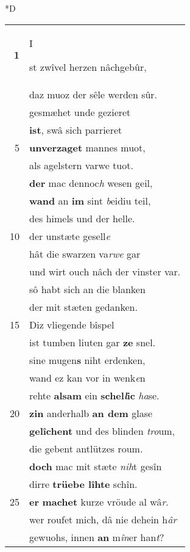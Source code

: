 \documentclass[8pt,a4paper,notitlepage]{article}
\begin{document}
\begin{table}[ht]
\begin{minipage}[t]{0.5\linewidth}
\small
\begin{center}*D
\end{center}
\begin{tabular}{rl}
\textbf{1} & \begin{Large}I\end{Large}st zwîvel herzen nâchgebûr,\\ 
 & daz muoz der sêle werden sûr.\\ 
 & gesmæhet unde gezieret\\ 
 & \textbf{ist}, swâ sich parrieret\\ 
5 & \textbf{unverzaget} mannes muot,\\ 
 & als agelstern varwe tuot.\\ 
 & \textbf{der} mac dennoc\textit{h} wesen geil,\\ 
 & \textbf{wand} an \textbf{im} sint \textit{b}eidiu teil,\\ 
 & des himels und der helle.\\ 
10 & der unstæte gesell\textit{e}\\ 
 & hât die swarzen va\textit{rwe} gar\\ 
 & und wirt ouch nâch der vinster var.\\ 
 & sô habt sich an die blanken\\ 
 & der mit stæten gedanken.\\ 
15 & Diz vliegende bîspel\\ 
 & ist tumben liuten gar \textbf{ze} snel.\\ 
 & sine mugen\textbf{s} niht erdenken,\\ 
 & wand ez kan vor in wenk\textit{e}n\\ 
 & rehte \textbf{alsam} ein \textbf{schel\textit{l}ic} \textit{ha}se.\\ 
20 & \textbf{zin} anderhalb \textbf{an dem} glase\\ 
 & \textbf{gelîchent} und des blinden \textit{tro}um,\\ 
 & die gebent antlützes roum.\\ 
 & \textbf{doch} mac mit stæte \textit{nih}t gesîn\\ 
 & dirre \textbf{trüebe lîhte} schîn.\\ 
25 & \textbf{er} \textbf{machet} kurze vröude al wâ\textit{r}.\\ 
 & wer roufet mich, dâ nie dehein h\textit{âr}\\ 
 & gewuohs, innen \textbf{an} m\textit{în}er han\textit{t}?\\ 

\end{tabular}
\end{minipage}
\end{table}
\end{document}
